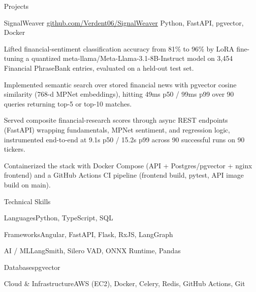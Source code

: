 \documentclass[
	11pt
]{../../../template}
\begin{document}
	\begin{rSection}{P}{rojects}
		\begin{rSectionEntry}
			{SignalWeaver}
			{\href{https://github.com/Verdent06/SignalWeaver}{github.com/Verdent06/SignalWeaver}}
			{}
			{Python, FastAPI, pgvector, Docker}
			{}

			\item Lifted financial-sentiment classification accuracy from 81\% to 96\% by LoRA fine-tuning a quantized meta-llama/Meta-Llama-3.1-8B-Instruct model on 3,454 Financial PhraseBank entries, evaluated on a held-out test set.
			\item Implemented semantic search over stored financial news with pgvector cosine similarity (768-d MPNet embeddings), hitting 49ms p50 / 99ms p99 over 90 queries returning top-5 or top-10 matches.
			\item Served composite financial-research scores through async REST endpoints (FastAPI) wrapping fundamentals, MPNet sentiment, and regression logic, instrumented end-to-end at 9.1s p50 / 15.2s p99 across 90 successful runs on 90 tickers.
			\item Containerized the stack with Docker Compose (API + Postgres/pgvector + nginx frontend) and a GitHub Actions CI pipeline (frontend build, pytest, API image build on main).
		\end{rSectionEntry}
	\end{rSection}

	\begin{rSection}{T}{echnical Skills}
		\begin{rSet}{Languages}{Python, TypeScript, SQL}
		\end{rSet}
		\begin{rSet}{Frameworks}{Angular, FastAPI, Flask, RxJS, LangGraph}
		\end{rSet}
		\begin{rSet}{AI / ML}{LangSmith, Silero VAD, ONNX Runtime, Pandas}
		\end{rSet}
		\begin{rSet}{Databases}{pgvector}
		\end{rSet}
		\begin{rSet}{Cloud \& Infrastructure}{AWS (EC2), Docker, Celery, Redis, GitHub Actions, Git}
		\end{rSet}
	\end{rSection}
\end{document}
